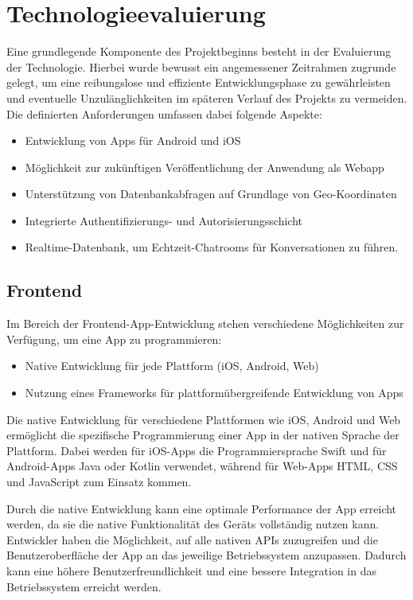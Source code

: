 \section{Technologieevaluierung}

Eine grundlegende Komponente des Projektbeginns besteht in der Evaluierung der Technologie. Hierbei wurde bewusst ein angemessener Zeitrahmen zugrunde gelegt, um eine reibungslose und effiziente Entwicklungsphase zu gewährleisten und eventuelle Unzulänglichkeiten im späteren Verlauf des Projekts zu vermeiden. Die definierten Anforderungen umfassen dabei folgende Aspekte:

\begin{itemize}
    \item Entwicklung von Apps für Android und iOS
    \item Möglichkeit zur zukünftigen Veröffentlichung der Anwendung als Webapp
    \item Unterstützung von Datenbankabfragen auf Grundlage von Geo-Koordinaten
    \item Integrierte Authentifizierungs- und Autorisierungsschicht
    \item Realtime-Datenbank, um Echtzeit-Chatrooms für Konversationen zu führen.
\end{itemize}

\subsection{Frontend}

Im Bereich der Frontend-App-Entwicklung stehen verschiedene Möglichkeiten zur Verfügung, um eine App zu programmieren:
\begin{itemize}
    \item Native Entwicklung für jede Plattform (iOS, Android, Web)
    \item Nutzung eines Frameworks für plattformübergreifende Entwicklung von Apps
\end{itemize}

Die native Entwicklung für verschiedene Plattformen wie iOS, Android und Web ermöglicht die spezifische Programmierung einer App in der nativen Sprache der Plattform. Dabei werden für iOS-Apps die Programmiersprache Swift und für Android-Apps Java oder Kotlin verwendet, während für Web-Apps HTML, CSS und JavaScript zum Einsatz kommen.

Durch die native Entwicklung kann eine optimale Performance der App erreicht werden, da sie die native Funktionalität des Geräts vollständig nutzen kann. Entwickler haben die Möglichkeit, auf alle nativen APIs zuzugreifen und die Benutzeroberfläche der App an das jeweilige Betriebssystem anzupassen. Dadurch kann eine höhere Benutzerfreundlichkeit und eine bessere Integration in das Betriebssystem erreicht werden.

